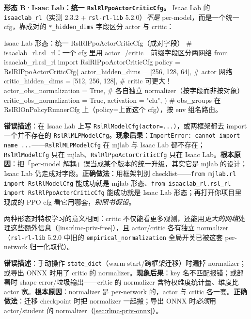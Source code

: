 \textbf{形态 B·Isaac Lab：统一 \texttt{RslRlPpoActorCriticCfg}。} Isaac Lab 的 \verb|isaaclab_rl|（实测 2.3.2 + \verb|rsl-rl-lib| 5.2.0）\emph{不是} per-model，而是一个统一 cfg，靠成对的 \verb|*_hidden_dims| 字段区分 actor 与 critic：

\begin{codebox}[Python]{Isaac Lab 形态：统一 RslRlPpoActorCriticCfg（成对字段）}
# isaaclab_rl.rsl_rl：一个 cfg 里用 actor_/critic_ 前缀字段区分两网络
from isaaclab_rl.rsl_rl import RslRlPpoActorCriticCfg
policy = RslRlPpoActorCriticCfg(
    actor_hidden_dims  = [256, 128, 64],    # actor 网络
    critic_hidden_dims = [512, 256, 128],   # critic 可更大！
    actor_obs_normalization  = True,        # 各自独立 normalizer（按字段而非按对象）
    critic_obs_normalization = True,
    activation = "elu",
)
# obs_groups 在 RslRlOnPolicyRunnerCfg 上（policy=上面这个 cfg），按 env 组名路由。
\end{codebox}

\begin{pitfall}
\textbf{错误描述}：在 Isaac Lab 上写 \verb|RslRlModelCfg(actor=...)|，或两框架都去 import 一个并不存在的 \verb|RslRlMLPModelCfg|。\textbf{现象后果}：\verb|ImportError: cannot import name ...|——\verb|RslRlMLPModelCfg| 在 mjlab 与 Isaac Lab 都不存在；\verb|RslRlModelCfg| 只在 mjlab、\verb|RslRlPpoActorCriticCfg| 只在 Isaac Lab。\textbf{根本原因}：把「per-model 解耦」误当成某个版本的统一升级，其实它是 mjlab 的设计；Isaac Lab 仍走成对字段。\textbf{正确做法}：用框架判别 checklist——\verb|from mjlab.rl import RslRlModelCfg| 能成功就是 mjlab 形态、\verb|from isaaclab_rl.rsl_rl import RslRlPpoActorCriticCfg| 能成功就是 Isaac Lab 形态；再打开你项目里现成的 PPO cfg 看它用哪套，\emph{别照书假设}。
\end{pitfall}

两种形态对特权学习的意义相同：critic 不仅能看更多观测，还能用\emph{更大的网络}处理这些额外信息（\cref{ins:rlmc-priv-free}），且 actor/critic 各有独立 normalizer（\verb|rsl-rl-lib| 5.2.0 中旧的 \verb|empirical_normalization| 全局开关已被这套 per-network 归一化取代）。

\begin{pitfall}
\textbf{错误描述}：手动操作 \verb|state_dict|（warm start/跨框架迁移）时漏掉 normalizer；或导出 ONNX 时用了 critic 的 normalizer。\textbf{现象后果}：key 名不匹配报错；或部署时 shape error/垃圾输出——critic 的 normalizer 含特权维度统计量、维度比 actor 宽。\textbf{根本原因}：normalizer 是 per-network 的，actor 与 critic 各一套。\textbf{正确做法}：迁移 checkpoint 时把 normalizer 一起搬；导出 ONNX 时\emph{必须}用 actor/student 的 normalizer（\cref{sec:rlmc-priv-onnx}）。
\end{pitfall}


